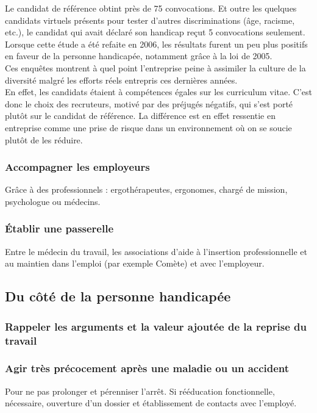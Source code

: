Le candidat de référence obtint près de 75 convocations.
Et outre les quelques candidats virtuels présents pour tester d'autres discriminations (\^age, racisme, etc.), le candidat qui avait déclaré son handicap reçut 5 convocations seulement.\\

Lorsque cette étude a été refaite en 2006, les résultats furent un peu plus positifs en faveur de la personne handicapée, notamment gr\^ace à la loi de 2005.\\

Ces enqu\^etes montrent à quel point l'entreprise peine à assimiler la culture de la diversité malgré les efforts réels entrepris ces dernières années. \\
En effet, les candidats étaient à compétences égales sur les curriculum vitae. C'est donc le choix des recruteurs, motivé par des préjugés négatifs, qui s'est porté plut\^ot sur le candidat de référence. La différence est en effet ressentie en entreprise comme une prise de risque dans un environnement où on se soucie plutôt de les réduire.

\subsubsection{Accompagner les employeurs}
Grâce à des professionnels : ergothérapeutes, ergonomes, chargé de mission, psychologue ou médecins.

\subsubsection{Établir une passerelle}
Entre le médecin du travail, les associations d'aide à l'insertion professionnelle et au maintien dans l'emploi (par exemple Comète) et avec l'employeur.

\subsection{Du c\^oté de la personne handicapée}

\subsubsection{Rappeler les arguments et la valeur ajoutée de la reprise du travail}

\subsubsection{Agir très précocement après une maladie ou un accident}
Pour ne pas prolonger et pérenniser l'arrêt.
Si rééducation fonctionnelle, nécessaire, ouverture d'un dossier et établissement de contacts avec l'employé.